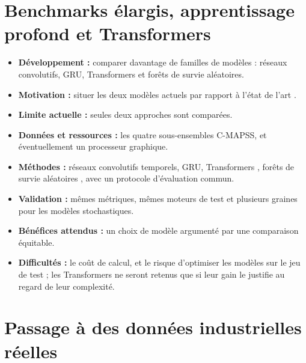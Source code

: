 \section{Benchmarks élargis, apprentissage profond et Transformers}\label{sec:p-benchmark}

\begin{itemize}
\item \textbf{Développement :} comparer davantage de familles de modèles : réseaux convolutifs, GRU, Transformers et forêts de survie aléatoires.
\item \textbf{Motivation :} situer les deux modèles actuels par rapport à l'état de l'art \cite{babu2016,li2018,ramasso2014}.
\item \textbf{Limite actuelle :} seules deux approches sont comparées.
\item \textbf{Données et ressources :} les quatre sous-ensembles C-MAPSS, et éventuellement un processeur graphique.
\item \textbf{Méthodes :} réseaux convolutifs temporels, GRU, Transformers \cite{vaswani2017}, forêts de survie aléatoires \cite{ishwaran2008}, avec un protocole d'évaluation commun.
\item \textbf{Validation :} mêmes métriques, mêmes moteurs de test et plusieurs graines pour les modèles stochastiques.
\item \textbf{Bénéfices attendus :} un choix de modèle argumenté par une comparaison équitable.
\item \textbf{Difficultés :} le coût de calcul, et le risque d'optimiser les modèles sur le jeu de test ; les Transformers ne seront retenus que si leur gain le justifie au regard de leur complexité.
\end{itemize}

\section{Passage à des données industrielles réelles}\label{sec:p-donnees}

